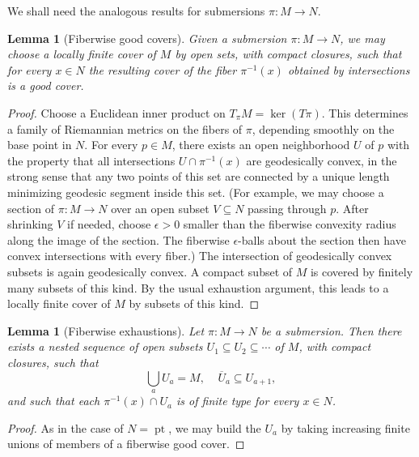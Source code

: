 \documentclass[11pt]{amsart}
\newtheorem{lemma}[theorem]{Lemma}
\theoremstyle{definition}
\theoremstyle{remark}
\newcommand\pt{\on{pt}}
\newcommand{\on}{\operatorname}
\renewcommand{\ker}{ \on{ker}}
\newcommand{\ol}{\overline}
\renewcommand{\subset}{\subseteq}
\begin{document}
We shall need the analogous results for submersions  $\pi\colon M\to N$. 
%
\begin{lemma}[Fiberwise good covers]
	Given a submersion $\pi\colon M\to N$, we may choose a locally finite cover of $M$ by open sets, with compact closures, such that for every $x\in N$ the resulting cover of the fiber $\pi^{-1}(x)$ obtained by intersections is a good cover.
\end{lemma}
\begin{proof}
	Choose a Euclidean inner product on $T_\pi M=\ker(T\pi)$. This determines a family of Riemannian metrics on the fibers of $\pi$, depending smoothly on the base point in $N$.  
	For every $p\in M$, there exists an open neighborhood $U$ of $p$ with the 
	property that all intersections $U\cap \pi^{-1}(x)$ are geodesically convex, in the strong sense that any two points of this set are connected by a unique length minimizing geodesic segment inside this set. 
		(For example, we may choose a section of $\pi\colon M\to N$ over 
	an open subset $V\subset N$
	passing through $p$. After shrinking $V$ if needed, choose $\epsilon>0$ smaller than the fiberwise convexity radius along the image of the section. The fiberwise $\epsilon$-balls about the section then have convex intersections with every fiber.)
	 The intersection of geodesically convex subsets is again geodesically convex. A compact subset of $M$ is covered by finitely many subsets of this kind. 
	By the usual exhaustion argument, this leads to a locally finite cover of $M$ by  subsets of this kind. 
\end{proof}

\begin{lemma}[Fiberwise exhaustions]
	Let $\pi\colon M\to N$ be a submersion. Then there exists a nested sequence of open subsets $U_1\subset U_2\subset \cdots $ of $M$, with compact closures, 
	such that 
	\[ \bigcup_a U_a=M, \ \ \ \ \ \ol{U}_a\subset U_{a+1},\] 
	and such that each $\pi^{-1}(x)\cap U_a$ is of finite type for every $x\in N$. 
\end{lemma} 
\begin{proof}
	As in the case of $N=\pt$, we may build the $U_a$ by taking increasing finite unions of members of a fiberwise good cover. 
\end{proof}
\end{document}
